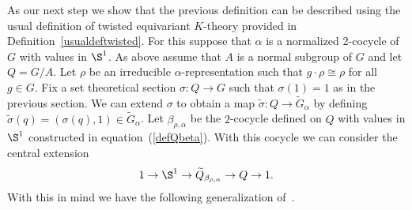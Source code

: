 As our next step we show that the previous definition can be described using the usual definition
of twisted equivariant $K$-theory provided in Definition~\ref{usualdeftwisted}.
For this suppose that $\alpha$ is a normalized 2-cocycle of $G$ with values in $\S^{1}$.
As above assume that $A$ is a normal subgroup of $G$ and let $Q=G/A$. Let $\rho$ be an
irreducible $\alpha$-representation such that $g\cdot\rho\cong\rho$ for all $g \in G$. Fix
a set theoretical section $\sigma\colon Q\to G$ such that $\sigma(1)=1$ as in the previous section.
We can extend $\sigma$ to obtain a map $\tilde{\sigma}\colon Q\to \widetilde{G}_{\alpha}$ by defining
$\tilde{\sigma}(q)=(\sigma(q),1)\in \widetilde{G}_{\alpha}$. Let $\beta_{\rho,\alpha}$ be the
$2$-cocycle defined on $Q$ with values in $\S^{1}$ constructed
in equation~(\ref{defQbeta}). With this cocycle we can consider the central extension
\begin{gather*}
1\rightarrow \S^{1}\rightarrow \widetilde{Q}_{\beta_{\rho,\alpha}}
\rightarrow Q\rightarrow 1.
\end{gather*}
With this in mind we have the following generalization of~\cite[Theorem 2.1]{GomezUribe}.

